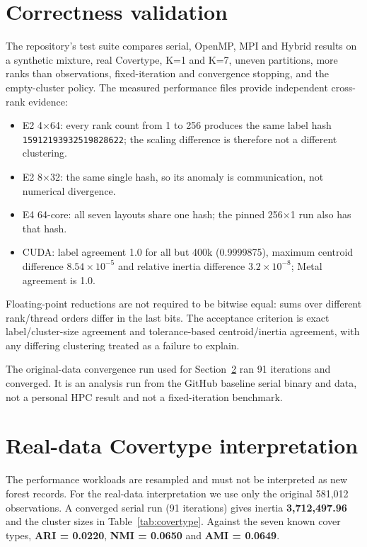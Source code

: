 \documentclass[10pt,a4paper]{article}
\newcommand{\code}[1]{\texttt{#1}}
\begin{document}
\section{Correctness validation}
The repository's test suite compares serial, OpenMP, MPI and Hybrid results on
a synthetic mixture, real Covertype, K=1 and K=7, uneven partitions, more ranks
than observations, fixed-iteration and convergence stopping, and the
empty-cluster policy. The measured performance files provide independent
cross-rank evidence:
\begin{itemize}
\item E2 4$\times$64: every rank count from 1 to 256 produces the same label
      hash \code{15912193932519828622}; the scaling difference is therefore not
      a different clustering.
\item E2 8$\times$32: the same single hash, so its anomaly is communication,
      not numerical divergence.
\item E4 64-core: all seven layouts share one hash; the pinned 256$\times$1
      run also has that hash.
\item CUDA: label agreement 1.0 for all but 400k (0.9999875), maximum centroid
      difference $8.54\times10^{-5}$ and relative inertia difference
      $3.2\times10^{-8}$; Metal agreement is 1.0.
\end{itemize}
Floating-point reductions are not required to be bitwise equal: sums over
different rank/thread orders differ in the last bits. The acceptance criterion
is exact label/cluster-size agreement and tolerance-based centroid/inertia
agreement, with any differing clustering treated as a failure to explain.

The original-data convergence run used for Section~\ref{sec:realdata} ran 91
iterations and converged. It is an analysis run from the GitHub baseline
serial binary and data, not a personal HPC result and not a fixed-iteration
benchmark.

\section{Real-data Covertype interpretation}
\label{sec:realdata}
The performance workloads are resampled and must not be interpreted as new
forest records. For the real-data interpretation we use only the original
581,012 observations. A converged serial run (91 iterations) gives inertia
\textbf{3,712,497.96} and the cluster sizes in Table~\ref{tab:covertype}.
Against the seven known cover types, \textbf{ARI = 0.0220}, \textbf{NMI =
0.0650} and \textbf{AMI = 0.0649}.
\end{document}
